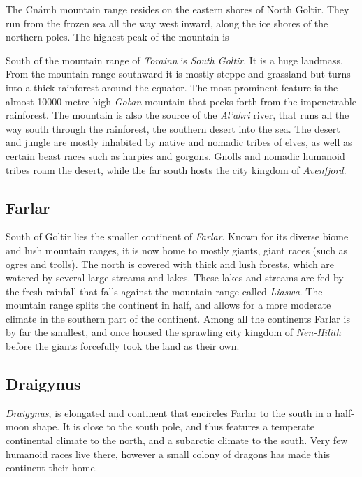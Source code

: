 The Cnámh mountain range resides on the eastern shores of North Goltir. They
run from the frozen sea all the way west inward, along the ice shores of the
northern poles. The highest peak of the mountain is 

South of the mountain range of \emph{Torainn} is \emph{South Goltir}. It is
a huge landmass. From the mountain range southward it is mostly steppe and
grassland but turns into a thick rainforest around the equator. The most
prominent feature is the almost 10000 metre high \emph{Goban} mountain that
peeks forth from the impenetrable rainforest. The mountain is also the source
of the \emph{Al'ahri} river, that runs all the way south through the
rainforest, the southern desert into the sea. The desert and jungle are mostly
inhabited by native and nomadic tribes of elves, as well as certain beast
races such as harpies and gorgons. Gnolls and nomadic humanoid tribes roam the
desert, while the far south hosts the city kingdom of \emph{Avenfjord}.

\subsection{Farlar}
\label{sec:Farlar}

South of Goltir lies the smaller continent of \emph{Farlar}. Known for its
diverse biome and lush mountain ranges, it is now home to mostly giants, giant
races (such as ogres and trolls). The north is covered with thick and lush
forests, which are watered by several large streams and lakes. These lakes
and streams are fed by the fresh rainfall that falls against the mountain range
called \emph{Liaswa}. The mountain range splits the continent in half, and
allows for a more moderate climate in the southern part of the continent. Among
all the continents Farlar is by far the smallest, and once housed the sprawling
city kingdom of \emph{Nen-Hilith} before the giants forcefully took the land as
their own.

\subsection{Draigynus}
\label{sec:Draigynus}

\emph{Draigynus}, is elongated and continent that encircles Farlar to the
south in a half-moon shape. It is close to the south pole, and thus features a
temperate continental climate to the north, and a subarctic climate to the
south. Very few humanoid races live there, however a small colony of dragons
has made this continent their home.

